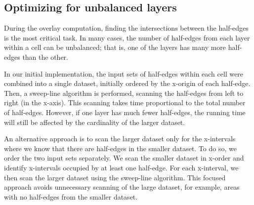 \subsection{Optimizing for unbalanced layers}\label{sec:unbalance}
During the overlay computation, finding the intersections between the half-edges is the most critical task. In many cases, the number of half-edges from each layer within a cell can be unbalanced; that is, one of the layers has many more half-edges than the other.

In our initial implementation, the input sets of half-edges within each cell were combined into a single dataset, initially ordered by the x-origin of each half-edge.
Then, a sweep-line algorithm is performed, scanning the half-edges from left to right (in the x-axis). This scanning takes time proportional to the total number of half-edges. However, if one layer has much fewer half-edges, the running time will still be affected by the cardinality of the larger dataset.

An alternative approach is to scan the larger dataset only for the x-intervals where we know that there are half-edges in the smaller dataset. To do so, we order the two input sets separately. We scan the smaller dataset in x-order and identify x-intervals occupied by at least one half-edge. For each x-interval, we then scan the larger dataset using the sweep-line algorithm. This focused approach avoids unnecessary scanning of the large dataset, for example, areas with no half-edges from the smaller dataset.
